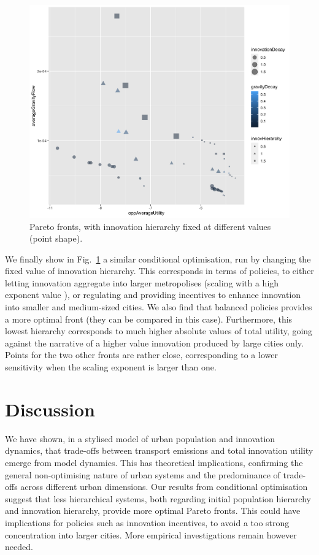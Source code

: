 \documentclass{article}
\begin{document}
\begin{figure}
	\centering
	\includegraphics[width=\linewidth]{pareto-oppAverageUtility-averageGravityFlow_VARYINGINNOVHIERARCHY_color-gravityDecay_size-innovationDecay.png}
	\caption{Pareto fronts, with innovation hierarchy fixed at different values (point shape).\label{fig:fig3}}
\end{figure}

We finally show in Fig.~\ref{fig:fig3} a similar conditional optimisation, run by changing the fixed value of innovation hierarchy. This corresponds in terms of policies, to either letting innovation aggregate into larger metropolises (scaling with a high exponent value \cite{pumain2006evolutionary}), or regulating and providing incentives to enhance innovation into smaller and medium-sized cities. We also find that balanced policies provides a more optimal front (they can be compared in this case). Furthermore, this lowest hierarchy corresponds to much higher absolute values of total utility, going against the narrative of a higher value innovation produced by large cities only. Points for the two other fronts are rather close, corresponding to a lower sensitivity when the scaling exponent is larger than one.




\section{Discussion}

We have shown, in a stylised model of urban population and innovation dynamics, that trade-offs between transport emissions and total innovation utility emerge from model dynamics. This has theoretical implications, confirming the general non-optimising nature of urban systems and the predominance of trade-offs across different urban dimensions. Our results from conditional optimisation suggest that less hierarchical systems, both regarding initial population hierarchy and innovation hierarchy, provide more optimal Pareto fronts. This could have implications for policies such as innovation incentives, to avoid a too strong concentration into larger cities. More empirical investigations remain however needed.
\end{document}

